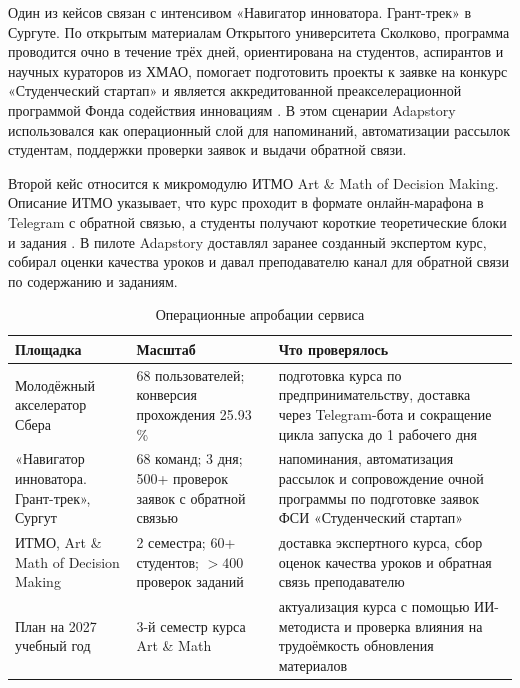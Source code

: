 Один из кейсов связан с интенсивом «Навигатор инноватора. Грант-трек»
в Сургуте. По открытым материалам Открытого университета Сколково,
программа проводится очно в течение трёх дней, ориентирована на студентов,
аспирантов и научных кураторов из ХМАО, помогает подготовить проекты
к заявке на конкурс «Студенческий стартап» и является аккредитованной
преакселерационной программой Фонда содействия инновациям
\cite{skolkovo_navigator_hmao_2026}. В этом сценарии Adapstory использовался
как операционный слой для напоминаний, автоматизации рассылок студентам,
поддержки проверки заявок и выдачи обратной связи.

Второй кейс относится к микромодулю ИТМО
Art \& Math of Decision Making. Описание ИТМО указывает, что курс проходит
в формате онлайн-марафона в Telegram с обратной связью, а студенты получают
короткие теоретические блоки и задания \cite{itmo_art_math_decision_making}.
В пилоте Adapstory доставлял заранее созданный экспертом курс, собирал
оценки качества уроков и давал преподавателю канал для обратной связи
по содержанию и заданиям.

\begin{table}[H]
  \centering
  \footnotesize
  \caption{Операционные апробации сервиса}
  \label{tab:operational-pilots}
  \begin{tabular}{|P{4.1cm}|P{4.0cm}|P{5.4cm}|}
  \hline
  \textbf{Площадка} & \textbf{Масштаб} & \textbf{Что проверялось} \\
  \hline
  Молодёжный акселератор Сбера & 68 пользователей; конверсия прохождения 25.93\,\% & подготовка курса по предпринимательству, доставка через Telegram-бота и сокращение цикла запуска до 1 рабочего дня \\
  \hline
  «Навигатор инноватора. Грант-трек», Сургут & 68 команд; 3 дня; 500+ проверок заявок с обратной связью & напоминания, автоматизация рассылок и сопровождение очной программы по подготовке заявок ФСИ «Студенческий стартап» \\
  \hline
  ИТМО, Art \& Math of Decision Making & 2 семестра; 60+ студентов; $>400$ проверок заданий & доставка экспертного курса, сбор оценок качества уроков и обратная связь преподавателю \\
  \hline
  План на 2027 учебный год & 3-й семестр курса Art \& Math & актуализация курса с помощью ИИ-методиста и проверка влияния на трудоёмкость обновления материалов \\
  \hline
  \end{tabular}
\end{table}

